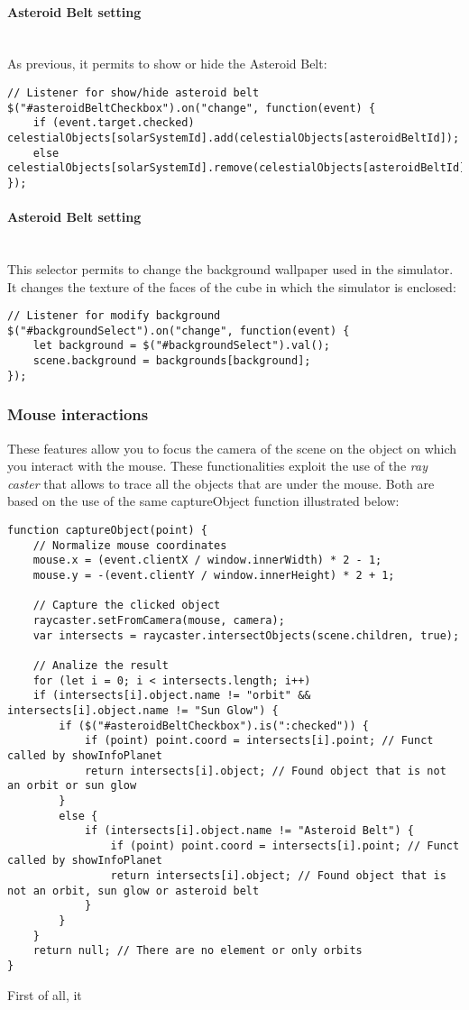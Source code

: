 \documentclass{article}
\begin{document}
\paragraph{Asteroid Belt setting}\mbox{}\\
As previous, it permits to show or hide the Asteroid Belt:
\begin{lstlisting}
// Listener for show/hide asteroid belt
$("#asteroidBeltCheckbox").on("change", function(event) {
	if (event.target.checked) celestialObjects[solarSystemId].add(celestialObjects[asteroidBeltId]);
	else celestialObjects[solarSystemId].remove(celestialObjects[asteroidBeltId]);
});
\end{lstlisting}
\paragraph{Asteroid Belt setting}\mbox{}\\
This selector permits to change the background wallpaper used in the simulator. It changes the texture of the faces of the cube in which the simulator is enclosed:
\begin{lstlisting}
// Listener for modify background
$("#backgroundSelect").on("change", function(event) {
	let background = $("#backgroundSelect").val();
	scene.background = backgrounds[background];
});
\end{lstlisting}

\subsubsection{Mouse interactions}
These features allow you to focus the camera of the scene on the object on which you interact with the mouse. These functionalities exploit the use of the \textit{ray caster} that allows to trace all the objects that are under the mouse. Both are based on the use of the same captureObject function illustrated below:
\begin{lstlisting}
function captureObject(point) {
	// Normalize mouse coordinates
	mouse.x = (event.clientX / window.innerWidth) * 2 - 1;
	mouse.y = -(event.clientY / window.innerHeight) * 2 + 1;
	
	// Capture the clicked object
	raycaster.setFromCamera(mouse, camera);
	var intersects = raycaster.intersectObjects(scene.children, true);
	
	// Analize the result
	for (let i = 0; i < intersects.length; i++)
	if (intersects[i].object.name != "orbit" && intersects[i].object.name != "Sun Glow") {
		if ($("#asteroidBeltCheckbox").is(":checked")) {
			if (point) point.coord = intersects[i].point; // Funct called by showInfoPlanet
			return intersects[i].object; // Found object that is not an orbit or sun glow
		}
		else {
			if (intersects[i].object.name != "Asteroid Belt") {
				if (point) point.coord = intersects[i].point; // Funct called by showInfoPlanet
				return intersects[i].object; // Found object that is not an orbit, sun glow or asteroid belt
			}
		}
	}
	return null; // There are no element or only orbits
}
\end{lstlisting}
First of all, it 
\end{document}
